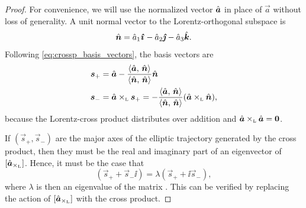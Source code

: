 \begin{proof}
    For convenience, we will use the normalized vector $\uvec{a}$ in place of $\vec{a}$ without loss of generality. 
    A unit normal vector to the Lorentz-orthogonal subspace is 
    \[\uvec{n} = \hat{a}_1\quati - \hat{a}_2\quatj - \hat{a}_3\quatk.\] 
    Following \cref{eq:crossp_basis_vectors}, the basis vectors are
    \begin{equation}
        \begin{split}
            \vec{s}_+ &= \uvec{a} - \frac{ \inner{\uvec{a}}{\uvec{n}} }{ \inner{\uvec{n}}{\uvec{n}} } \uvec{n} \\
            \vec{s}_- &= \lorcrossp{\uvec{a}}{\vec{s}_+} = -\frac{ \inner{\uvec{a}}{\uvec{n}} }{ \inner{\uvec{n}}{\uvec{n}} } \qty(\lorcrossp{\uvec{a}}{\uvec{n}}),
        \end{split}
    \end{equation}
    because the Lorentz-cross product distributes over addition and \(\lorcrossp{\uvec{a}}{\uvec{a}} = \mathbf{0}\). 

    If \((\vec{s}_+, \vec{s}_-)\) are the major axes of the elliptic trajectory generated by the cross product, then they must be the real and imaginary part of an eigenvector of \([\uvec{a}_{\lorcrossp{}{}}]\). Hence, it must be the case that 
    \begin{equation}
        [\uvec{a}_{\lorcrossp{}{}}](\vec{s}_+ + \vec{s}_-\ii) = \lambda(\vec{s}_+ + \ii\vec{s}_-),
\end{equation} 
    where \(\lambda\) is then an eigenvalue of the matrix \cite{Edwards2018}. This can be verified by replacing the action of \([\uvec{a}_{\lorcrossp{}{}}]\) with the cross product. 
    

\end{proof}
